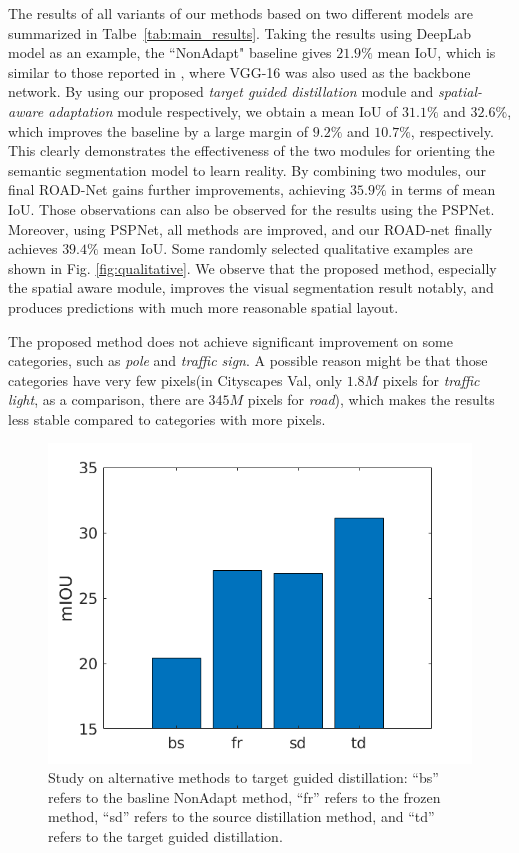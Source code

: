 \documentclass[10pt,twocolumn,letterpaper]{article}
\begin{document}
The results of all variants of our methods based on two different models are summarized in Talbe~\ref{tab:main_results}. Taking the results using DeepLab model as an example, the ``NonAdapt" baseline gives $21.9\%$ mean IoU, which is similar to those reported in \cite{hoffman2016fcns,zhang2017curriculum}, where VGG-16 was also used as the backbone network. By using our proposed \textit{target guided distillation} module and \textit{spatial-aware adaptation} module respectively, we obtain a mean IoU of $31.1\%$ and $32.6\%$, which improves the baseline by a large margin of $9.2\%$ and $10.7\%$, respectively. This clearly demonstrates the effectiveness of the two modules for orienting the semantic segmentation model to learn reality.  By combining two modules, our final ROAD-Net gains further improvements, achieving $35.9\%$ in terms of mean IoU. Those observations can also be observed for the results using the PSPNet. Moreover, using PSPNet, all methods are improved, and our ROAD-net finally achieves $39.4\%$ mean IoU. Some randomly selected qualitative examples are shown in Fig. \ref{fig:qualitative}. We observe that the proposed method, especially the spatial aware module, improves the visual segmentation result notably, and produces predictions with much more reasonable spatial layout.

The proposed method does not achieve significant improvement on some categories, such as \textit{pole} and \textit{traffic sign}. A possible reason might be that those categories have very few pixels(\eg in Cityscapes Val, only $1.8M$ pixels for \textit{traffic light}, as a comparison, there are $345M$ pixels for \textit{road}), which makes the results less stable compared to categories with more pixels. 

\begin{figure}
\centering
\includegraphics[width=0.7\linewidth]{fig_distillation.png}
\caption{Study on alternative methods to target guided distillation: ``bs'' refers to the basline NonAdapt method, ``fr'' refers to the frozen method, ``sd'' refers to the source distillation method, and ``td'' refers to the target guided distillation.}
\label{fig:frozen}
\end{figure}
\end{document}
